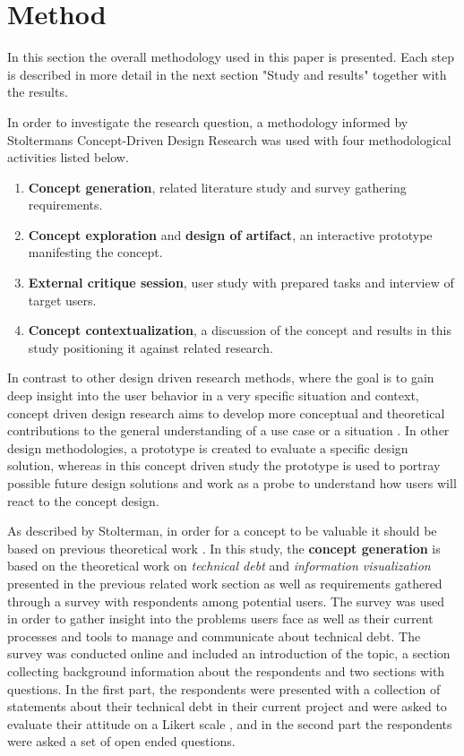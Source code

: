 

\section{Method}
In this section the overall methodology used in this paper is presented. Each step is described in more detail in the next section "Study and results" together with the results.

In order to investigate the research question, a methodology informed by Stoltermans Concept-Driven Design Research \cite{stolterman_concept-driven_2010} was used with four methodological activities listed below.

\smallskip
\begin{enumerate}
  \item \textbf{Concept generation}, related literature study and survey gathering requirements.
  \item \textbf{Concept exploration}  and \textbf{design of artifact}, an interactive prototype manifesting the concept.
  \item \textbf{External critique session}, user study with prepared tasks and interview of target users.
  \item \textbf{Concept contextualization}, a discussion of the concept and results in this study positioning it against related research.
\end{enumerate}
\smallskip

In contrast to other design driven research methods, where the goal is to gain deep insight into the user behavior in a very specific situation and context, concept driven design research aims to develop more conceptual and theoretical contributions to the general understanding of a use case or a situation \cite{stolterman_concept-driven_2010}.
In other design methodologies, a prototype is created to evaluate a specific design solution, whereas in this concept driven study the prototype is used to portray possible future design solutions and work as a probe to understand how users will react to the concept design.

As described by Stolterman, in order for a concept to be valuable it should be based on previous theoretical work \cite{stolterman_concept-driven_2010}.
In this study, the \textbf{concept generation} is based on the theoretical work on \textit{technical debt} and \textit{information visualization} presented in the previous related work section as well as requirements gathered through a survey with respondents among potential users.
The survey was used in order to gather insight into the problems users face as well as their current processes and tools to manage and communicate about technical debt. 
The survey was conducted online and included an introduction of the topic, a section collecting background information about the respondents and two sections with questions.
In the first part, the respondents were presented with a collection of statements about their technical debt in their current project and were asked to evaluate their attitude on a Likert scale \cite{wilson_questionnaires_2013}, and in the second part the respondents were asked a set of open ended questions.

